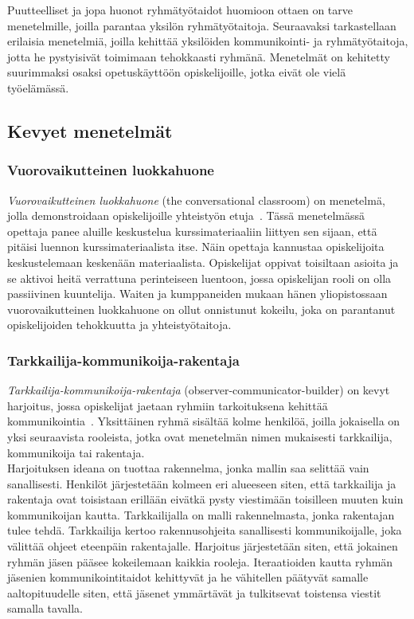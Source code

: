 \documentclass[finnish]{../tktltiki2}
\theoremstyle{definition}
\theoremstyle{remark}
\begin{document}
Puutteelliset ja jopa huonot ryhmätyötaidot huomioon ottaen on tarve menetelmille, joilla parantaa yksilön ryhmätyötaitoja.
Seuraavaksi tarkastellaan erilaisia menetelmiä, joilla
kehittää yksilöiden kommunikointi- ja ryhmätyötaitoja, jotta he pystyisivät toimimaan tehokkaasti ryhmänä. Menetelmät on
kehitetty suurimmaksi osaksi opetuskäyttöön opiskelijoille,
jotka eivät ole vielä työelämässä.

\subsection{Kevyet menetelmät}

\subsubsection{Vuorovaikutteinen luokkahuone}

\emph{Vuorovaikutteinen luokkahuone} (the conversational classroom) on menetelmä, jolla demonstroidaan opiskelijoille yhteistyön etuja~\cite{Waite:2004:SCV:1028174.971308}. Tässä menetelmässä opettaja panee aluille keskustelua kurssimateriaaliin liittyen sen sijaan, että pitäisi luennon kurssimateriaalista itse. Näin opettaja kannustaa opiskelijoita keskustelemaan keskenään materiaalista. Opiskelijat oppivat toisiltaan asioita ja se
aktivoi heitä verrattuna perinteiseen luentoon, jossa opiskelijan
rooli on olla passiivinen kuuntelija. Waiten ja kumppaneiden mukaan hänen yliopistossaan vuorovaikutteinen luokkahuone on ollut onnistunut kokeilu, joka on parantanut opiskelijoiden tehokkuutta ja yhteistyötaitoja.

\subsubsection{Tarkkailija-kommunikoija-rakentaja}

\emph{Tarkkailija-kommunikoija-rakentaja} (observer-communicator-builder) on kevyt harjoitus, jossa
opiskelijat jaetaan ryhmiin tarkoituksena kehittää
kommunikointia~\cite{Cushing:2003:TBP:948785.948797}. Yksittäinen
ryhmä sisältää kolme henkilöä, joilla jokaisella on yksi seuraavista
rooleista, jotka ovat menetelmän nimen mukaisesti tarkkailija, kommunikoija tai rakentaja.\\

Harjoituksen ideana on tuottaa rakennelma, jonka mallin saa selittää vain sanallisesti. Henkilöt järjestetään
kolmeen eri alueeseen siten, että tarkkailija ja rakentaja ovat
toisistaan erillään eivätkä pysty viestimään toisilleen muuten
kuin kommunikoijan kautta. Tarkkailijalla on malli rakennelmasta,
jonka rakentajan tulee tehdä. Tarkkailija kertoo rakennusohjeita
sanallisesti kommunikoijalle, joka välittää ohjeet eteenpäin rakentajalle. Harjoitus järjestetään siten, että jokainen ryhmän
jäsen pääsee kokeilemaan kaikkia rooleja. Iteraatioiden kautta
ryhmän jäsenien kommunikointitaidot kehittyvät ja he vähitellen päätyvät samalle aaltopituudelle siten, että jäsenet ymmärtävät ja tulkitsevat toistensa viestit samalla tavalla.
\end{document}
